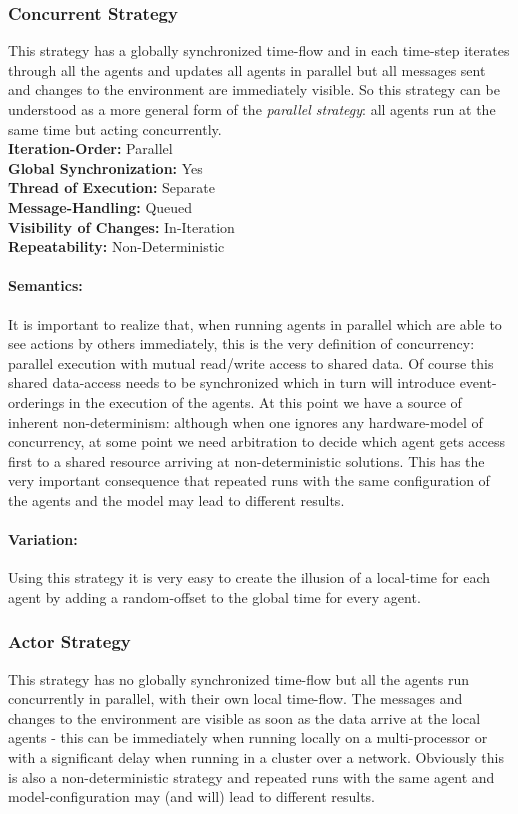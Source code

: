 \subsubsection{Concurrent Strategy}
This strategy has a globally synchronized time-flow and in each time-step iterates through all the agents and updates all agents in parallel but all messages sent and changes to the environment are immediately visible. So this strategy can be understood as a more general form of the \textit{parallel strategy}: all agents run at the same time but acting concurrently. \\

\textbf{Iteration-Order:} Parallel \\
\textbf{Global Synchronization:} Yes \\
\textbf{Thread of Execution:} Separate \\
\textbf{Message-Handling:} Queued \\
\textbf{Visibility of Changes:}	In-Iteration \\
\textbf{Repeatability:}	Non-Deterministic 

\paragraph{Semantics:} It is important to realize that, when running agents in parallel which are able to see actions by others immediately, this is the very definition of concurrency: parallel execution with mutual read/write access to shared data. Of course this shared data-access needs to be synchronized which in turn will introduce event-orderings in the execution of the agents. At this point we have a source of inherent non-determinism: although when one ignores any hardware-model of concurrency, at some point we need arbitration to decide which agent gets access first to a shared resource arriving at non-deterministic solutions. This has the very important consequence that repeated runs with the same configuration of the agents and the model may lead to different results.

\paragraph{Variation:} Using this strategy it is very easy to create the illusion of a local-time for each agent by adding a random-offset to the global time for every agent.



\subsubsection{Actor Strategy}
This strategy has no globally synchronized time-flow but all the agents run concurrently in parallel, with their own local time-flow. The messages and changes to the environment are visible as soon as the data arrive at the local agents - this can be immediately when running locally on a multi-processor or with a significant delay when running in a cluster over a network. Obviously this is also a non-deterministic strategy and repeated runs with the same agent and model-configuration may (and will) lead to different results. \\

